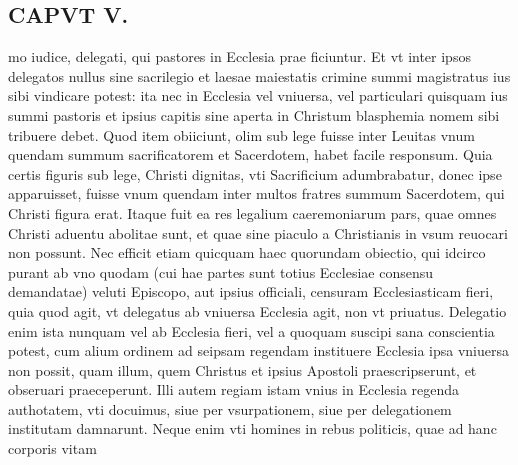 \documentclass{article}
\begin{document}
\begin{pages}
\section*{CAPVT  V. }
\marginpar{[ p.243 ]}\pstart mo iudice, delegati, qui pastores in Ecclesia prae ficiuntur. Et vt inter ipsos delegatos nullus sine sacrilegio et laesae maiestatis crimine summi magistratus ius sibi vindicare potest: ita nec in Ecclesia vel vniuersa, vel particulari quisquam ius summi pastoris et ipsius capitis sine aperta in Christum blasphemia nomem sibi tribuere debet. Quod item obiiciunt, olim sub lege fuisse inter Leuitas vnum quendam summum sacrificatorem et Sacerdotem, habet facile responsum. Quia certis figuris sub lege, Christi dignitas, vti Sacrificium adumbrabatur, donec ipse apparuisset, fuisse vnum quendam inter multos fratres summum Sacerdotem, qui Christi figura erat. Itaque fuit ea res legalium caeremoniarum pars, quae omnes Christi aduentu abolitae sunt, et quae sine piaculo a Christianis in vsum reuocari non possunt.  \pend\pstart Nec efficit etiam quicquam haec quorundam obiectio, qui idcirco purant ab vno quodam (cui hae partes sunt totius Ecclesiae consensu demandatae) veluti Episcopo, aut ipsius officiali, censuram Ecclesiasticam fieri, quia quod agit, vt delegatus ab vniuersa Ecclesia agit, non vt priuatus. Delegatio enim ista nunquam vel ab Ecclesia fieri, vel a quoquam suscipi sana conscientia potest, cum alium ordinem ad seipsam regendam instituere Ecclesia ipsa vniuersa non possit, quam illum, quem Christus et ipsius Apostoli praescripserunt, et obseruari praeceperunt. Illi autem regiam istam vnius in Ecclesia regenda authotatem, vti docuimus, siue per vsurpationem, siue per delegationem institutam damnarunt. Neque enim vti homines in rebus politicis, quae ad hanc corporis vitam  \pend

\end{pages}
\end{document}
